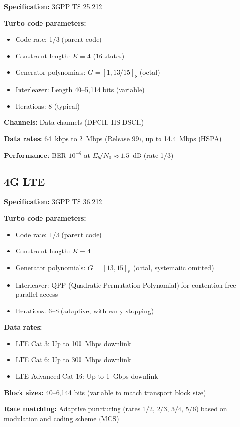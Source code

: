 \textbf{Specification:} 3GPP TS 25.212

\textbf{Turbo code parameters:}
\begin{itemize}
\item Code rate: 1/3 (parent code)
\item Constraint length: $K = 4$ (16 states)
\item Generator polynomials: $G = [1, 13/15]_8$ (octal)
\item Interleaver: Length 40--5,114 bits (variable)
\item Iterations: 8 (typical)
\end{itemize}

\textbf{Channels:} Data channels (DPCH, HS-DSCH)

\textbf{Data rates:} 64~kbps to 2~Mbps (Release 99), up to 14.4~Mbps (HSPA)

\textbf{Performance:} BER $10^{-6}$ at $E_b/N_0 \approx 1.5$~dB (rate 1/3)

\subsection{4G LTE}

\textbf{Specification:} 3GPP TS 36.212

\textbf{Turbo code parameters:}
\begin{itemize}
\item Code rate: 1/3 (parent code)
\item Constraint length: $K = 4$
\item Generator polynomials: $G = [13, 15]_8$ (octal, systematic omitted)
\item Interleaver: QPP (Quadratic Permutation Polynomial) for contention-free parallel access
\item Iterations: 6--8 (adaptive, with early stopping)
\end{itemize}

\textbf{Data rates:}
\begin{itemize}
\item LTE Cat 3: Up to 100~Mbps downlink
\item LTE Cat 6: Up to 300~Mbps downlink
\item LTE-Advanced Cat 16: Up to 1~Gbps downlink
\end{itemize}

\textbf{Block sizes:} 40--6,144 bits (variable to match transport block size)

\textbf{Rate matching:} Adaptive puncturing (rates 1/2, 2/3, 3/4, 5/6) based on modulation and coding scheme (MCS)

